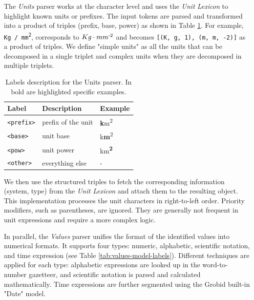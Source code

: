The \textit{Units} parser works at the character level and uses the \textit{Unit Lexicon} to highlight known units or prefixes. The input tokens are parsed and transformed into a product of triples (prefix, base, power) as shown in Table \ref{tab:units-model-labels}. For example, \texttt{ Kg / mm\textsuperscript{2}}, corresponds to \texttt{$Kg\cdot mm\textsuperscript{-2}$} and becomes \texttt{[(K, g, 1), (m, m, -2)]} as a product of triples. We define "simple units" as all the units that can be decomposed in a single triplet and complex units when they are decomposed in multiple triplets. 

\begin{table}[htbp]
\centering
  \caption{Labels description for the Units parser. In bold are highlighted specific examples. }
  \label{tab:units-model-labels}
  \begin{tabular}{lll}
    \toprule
    Label & Description & Example\\
    \midrule
    \texttt{<prefix>} & prefix of the unit  & \textbf{k}m\textsuperscript{2} \\
    \texttt{<base>} & unit base & k\textbf{m}\textsuperscript{2}\\
    \texttt{<pow>} & unit power & km\textsuperscript{\textbf{2}}\\
    \texttt{<other>} & everything else & - \\
  \bottomrule
\end{tabular}
\end{table}

We then use the structured triples to fetch the corresponding information (system, type) from the \textit{Unit Lexicon} and attach them to the resulting object. 
This implementation processes the unit characters in right-to-left order. 
Priority modifiers, such as parentheses, are ignored. They are generally not frequent in unit expressions and require a more complex logic.

In parallel, the \textit{Values} parser unifies the format of the identified values into numerical formats. It supports four types: numeric, alphabetic, scientific notation, and time expression (see Table \ref{tab:values-model-labels}). Different techniques are applied for each type: alphabetic expressions are looked up in the word-to-number gazetteer, and scientific notation is parsed and calculated mathematically. Time expressions are further segmented using the Grobid built-in "Date" model.

